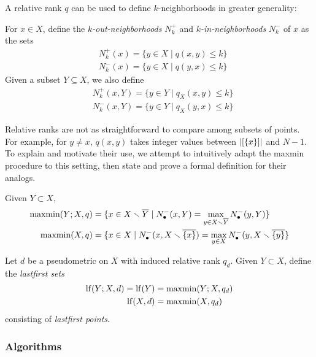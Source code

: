 \documentclass[
]{article}
\begin{document}
A relative rank \(q\) can be used to define \(k\)-neighborhoods in
greater generality:

\begin{definition}
    For $x \in X$, define the \emph{$k$-out-neighborhoods} $N^+_k$ and \emph{$k$-in-neighborhoods} $N^-_k$ of $x$ as the sets
    \begin{align*}
        & N^+_k(x)=\{y\in X\mid q(x,y)\leq k\} \\
        & N^-_k(x)=\{y\in X\mid q(y,x)\leq k\}
    \end{align*}
    Given a subset $Y \subseteq X$, we also define
    \begin{align*}
        & N^+_k(x,Y)=\{y\in Y\mid q_X(x,y)\leq k\} \\
        & N^-_k(x,Y)=\{y\in Y\mid q_X(y,x)\leq k\}
    \end{align*}
\end{definition}

Relative ranks are not as straightforward to compare among subsets of
points. For example, for \(y\neq x\), \(q(x,y)\) takes integer values
between \(\lvert [\{x\}]\rvert\) and \(N-1\). To explain and motivate
their use, we attempt to intuitively adapt the maxmin procedure to this
setting, then state and prove a formal definition for their analogs.

\begin{lemma}
    Given $Y\subset X$,
    \begin{align*}
        \operatorname{maxmin}(Y;X,q) &= \{x\in X\smallsetminus \overline{Y}\mid N_\bullet^-(x,Y) = \max_{y\in X\smallsetminus \overline{Y}}{N_\bullet^-(y,Y)}\} \\
        \operatorname{maxmin}(X,q) &= \{x\in X\mid N_\bullet^-(x,X \smallsetminus \overline{\{x\}}) = \max_{y\in X}{N_\bullet^-(y,X \smallsetminus \overline{\{y\}}}\}
    \end{align*}
\end{lemma}

\begin{definition}
    Let $d$ be a pseudometric on $X$ with induced relative rank $q_d$.
    Given $Y\subset X$, define the \emph{lastfirst sets}
    \begin{align*}
        \operatorname{lf}(Y;X,d) = \operatorname{lf}(Y) &= \operatorname{maxmin}(Y;X,q_d) \\
        \operatorname{lf}(X,d) &= \operatorname{maxmin}(X,q_d)
    \end{align*}
    consisting of \emph{lastfirst points}.
\end{definition}

\hypertarget{algorithms}{%
\subsubsection{Algorithms}\label{algorithms}}
\end{document}
